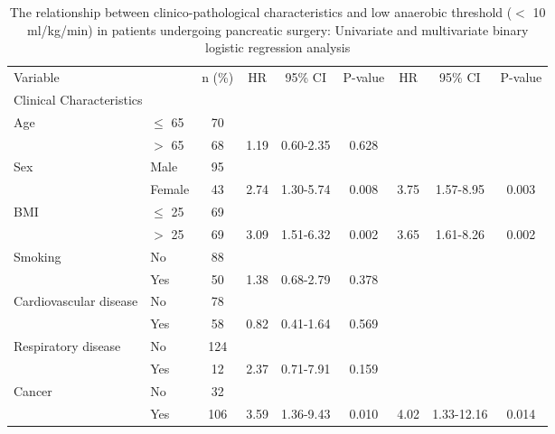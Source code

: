 \begin{sidewaystable}[htbp]
	\caption{The relationship between clinico-pathological characteristics and low anaerobic threshold ($<$ 10 ml/kg/min) in patients undergoing pancreatic surgery: Univariate and multivariate binary logistic regression analysis}
	\label{table:cpet_oj_table5}
	\centering
	\begin{tabular}{l l c c c c c c c}
		Variable                &           & n (\%) & HR   & 95\% CI    & P-value & HR   & 95\% CI    & P-value \\
		\multicolumn{9}{l}{Clinical Characteristics}                                                             \\
		Age                     & $\leq$ 65 & 70     &      &            &         &      &            &  \\
		                        & $>$ 65    & 68     & 1.19 & 0.60-2.35  & 0.628   &      &            &  \\
		Sex                     & Male      & 95     &      &            &         &      &            &  \\
		                        & Female    & 43     & 2.74 & 1.30-5.74  & 0.008   & 3.75 & 1.57-8.95  & 0.003   \\
		BMI                     & $\leq$ 25 & 69     &      &            &         &      &            &  \\
		                        & $>$ 25    & 69     & 3.09 & 1.51-6.32  & 0.002   & 3.65 & 1.61-8.26  & 0.002   \\
		Smoking                 & No        & 88     &      &            &         &      &            &  \\
		                        & Yes       & 50     & 1.38 & 0.68-2.79  & 0.378   &      &            &  \\
		Cardiovascular disease  & No        & 78     &      &            &         &      &            &  \\
		                        & Yes       & 58     & 0.82 & 0.41-1.64  & 0.569   &      &            &  \\
		Respiratory disease     & No        & 124    &      &            &         &      &            &  \\
		                        & Yes       & 12     & 2.37 & 0.71-7.91  & 0.159   &      &            &  \\
		Cancer                  & No        & 32     &      &            &         &      &            &  \\
		                        & Yes       & 106    & 3.59 & 1.36-9.43  & 0.010   & 4.02 & 1.33-12.16 & 0.014   \\

\end{tabular}
\end{sidewaystable}
